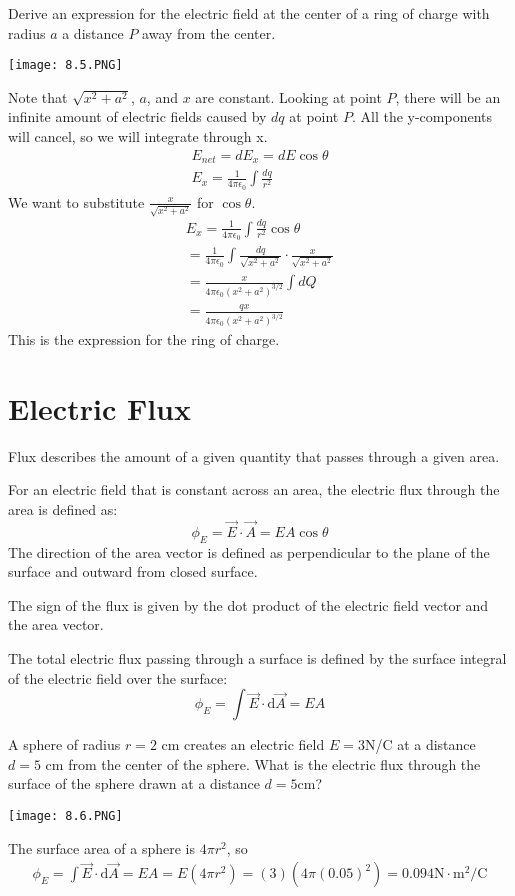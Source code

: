 \documentclass[../em.tex]{subfiles}
\begin{document}
\begin{example}
    Derive an expression for the electric field at the center of a ring of charge with radius $a$ a distance $P$ away from the center.
    \begin{center}
        \texttt{[image: 8.5.PNG]}
    \end{center}
    Note that $\sqrt{x^2+a^2}$, $a$, and $x$ are constant. 
    \smallbreak
    Looking at point $P$, there will be an infinite amount of electric fields caused by $dq$ at point $P$.
    \smallbreak
    All the y-components will cancel, so we will integrate through x.
    \begin{align*}
        E_{net}=dE_x=dE\cos\theta
        \\
        E_x=\frac{1}{4\pi\epsilon_0}\int\frac{dq}{r^2}
    \end{align*}
    We want to substitute $\frac{x}{\sqrt{x^2+a^2}}$ for $\cos\theta$.
    \begin{align*}
        E_x=\frac{1}{4\pi\epsilon_0}\int\frac{dq}{r^2}\cos\theta
        \\
        =\frac{1}{4\pi\epsilon_0}\int\frac{dq}{\sqrt{x^2+a^2}}\cdot\frac{x}{\sqrt{x^2+a^2}}
        \\
        =\frac{x}{4\pi\epsilon_0(x^2+a^2)^{3/2}}\int{dQ}
        \\
        =\frac{qx}{4\pi\epsilon_0(x^2+a^2)^{3/2}}
    \end{align*}
    This is the expression for the ring of charge. 
\end{example}

\section{Electric Flux}
Flux describes the amount of a given quantity that passes through a given area.

For an electric field that is constant across an area, the electric flux through the area is defined as:
\[\phi_E=\vec{E}\cdot\vec{A}=EA\cos\theta\]
The direction of the area vector is defined as perpendicular to the plane of the surface and outward from closed surface.

The sign of the flux is given by the dot product of the electric field vector and the area vector.

The total electric flux passing through a surface is defined by the surface integral of the electric field over the surface:
\[\phi_E=\int\vec{E}\cdot\mathrm{d}\vec{A}=EA\]
\begin{example}
    A sphere of radius $r=2$ cm creates an electric field $E=3$N/C at a distance $d=5$ cm from the center of the sphere. What is the electric flux through the surface of the sphere drawn at a distance $d=5$cm?
    \begin{center}
        \texttt{[image: 8.6.PNG]}
    \end{center}
    The surface area of a sphere is $4\pi r^2$, so
    \begin{align*}
        \phi_E=\int\vec{E}\cdot\mathrm{d}\vec{A}=EA=E(4\pi r^2)=(3)(4\pi(0.05)^2)=0.094\text{N}\cdot\text{m}^2\text{/C}
    \end{align*} 
\end{example}
\end{document}
